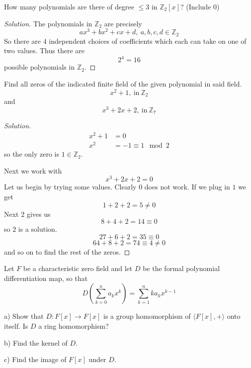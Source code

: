 \begin{prob}
    How many polynomials are there of degree $\leq 3$ in 
    $\mathbb Z_2[x]$? (Include $0$)
\end{prob}
\begin{proof}[Solution]
    The polynomials in $\mathbb Z_2$ are precisely 
    \[
        ax^3 + bx^2 + cx + d, \ a,b,c,d \in \mathbb Z_2
    \]
    So there are $4$ independent choices of coefficients which 
    each can take on one of two values. Thus there are 
    \[
        2^4 = 16
    \]
    possible polynomials in $\mathbb Z_2$.
\end{proof}
\begin{prob}
    Find all zeros of the indicated finite field of 
    the given polynomial in said field. 
    \[
        x^2+1,\ \text{in} \ \mathbb Z_2
    \]
    and 
    \[
        x^3 + 2x +2, \ \text{in} \ \mathbb Z_7
    \]
\end{prob}
\begin{proof}[Solution]
    \begin{align*}
        x^2 + 1 &= 0 \\ 
        x^2 &= -1 \equiv 1 \mod 2 
    \end{align*}
    so the only zero is $1 \in \mathbb Z_2$.

    Next we work with 
    \[
        x^3 + 2x + 2 = 0
    \]
    Let us begin by trying some values. Clearly $0$ does not work. 
    If we plug in $1$ we get 
    \[
        1 + 2 + 2 = 5 \neq 0
    \]
    Next $2$ gives us 
    \[
        8 + 4 + 2 = 14 \equiv 0
    \]
    so $2$ is a solution.
    \[
        27 + 6 + 2 = 35 \equiv 0
    \]
    \[
        64 + 8 + 2 = 74 \equiv 4 \neq 0  
    \]
    and so on to find the rest of the zeros. 
\end{proof}
\begin{prob}
    Let $F$ be a characteristic zero field and let $D$ be the 
    formal polynomial differentiation map, so that 
    \[
        D\left(\displaystyle\sum_{k=0}^{n}a_kx^k\right)
        = 
        \displaystyle\sum_{k=1}^{n}ka_kx^{k-1}
    \]
    
    a) Show that $D : F[x] \to F[x]$ is a group homomorphism 
    of $\langle F[x], +\rangle$ onto itself. Is $D$ a ring 
    homomorphism?

    b) Find the kernel of $D$. 

    c) Find the image of $F[x]$ under $D$.
\end{prob}
